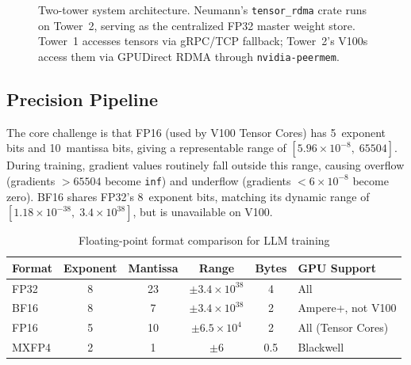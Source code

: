 \documentclass[11pt,letterpaper]{article}
\theoremstyle{definition}
\begin{document}
\begin{figure}[htbp]
\caption{Two-tower system architecture. Neumann's \texttt{tensor\_rdma} crate runs on Tower~2, serving as the centralized FP32 master weight store. Tower~1 accesses tensors via gRPC/TCP fallback; Tower~2's V100s access them via GPUDirect RDMA through \texttt{nvidia-peermem}.}
\label{fig:system-arch}
\end{figure}

\subsection{Precision Pipeline}

The core challenge is that FP16 (used by V100 Tensor Cores) has 5~exponent bits and 10~mantissa bits, giving a representable range of $[5.96 \times 10^{-8},\; 65504]$. During training, gradient values routinely fall outside this range, causing overflow (gradients $> 65504$ become \texttt{inf}) and underflow (gradients $< 6 \times 10^{-8}$ become zero). BF16 shares FP32's 8~exponent bits, matching its dynamic range of $[1.18 \times 10^{-38},\; 3.4 \times 10^{38}]$, but is unavailable on V100.

\begin{table}[htbp]
\centering
\caption{Floating-point format comparison for LLM training}
\label{tab:fp-comparison}
\begin{tabular}{@{}lccccl@{}}
\toprule
\textbf{Format} & \textbf{Exponent} & \textbf{Mantissa} & \textbf{Range} & \textbf{Bytes} & \textbf{GPU Support} \\
\midrule
FP32 & 8 & 23 & $\pm 3.4 \times 10^{38}$ & 4 & All \\
BF16 & 8 & 7 & $\pm 3.4 \times 10^{38}$ & 2 & Ampere+, not V100 \\
FP16 & 5 & 10 & $\pm 6.5 \times 10^{4}$ & 2 & All (Tensor Cores) \\
MXFP4 & 2 & 1 & $\pm 6$ & 0.5 & Blackwell \\
\bottomrule
\end{tabular}
\end{table}
\end{document}
